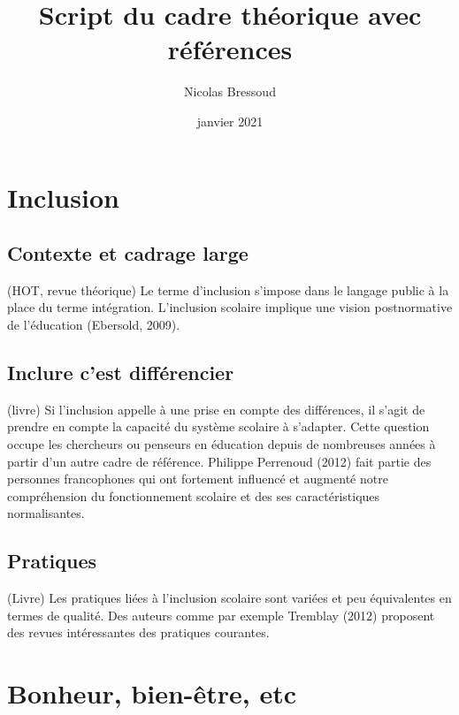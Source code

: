 \documentclass[
  french,
]{article}
\title{Script du cadre théorique avec références}
\author{Nicolas Bressoud}
\date{janvier 2021}
\begin{document}
\maketitle

\renewcommand*\contentsname{Table des matières}
{
\setcounter{tocdepth}{2}
\tableofcontents
}
\hypertarget{inclusion}{%
\section{Inclusion}\label{inclusion}}

\hypertarget{contexte-et-cadrage-large}{%
\subsection{Contexte et cadrage large}\label{contexte-et-cadrage-large}}

(HOT, revue théorique) Le terme d'inclusion s'impose dans le langage public à la place du terme intégration. L'inclusion scolaire implique une vision postnormative de l'éducation (Ebersold, 2009).

\hypertarget{inclure-cest-diffuxe9rencier}{%
\subsection{Inclure c'est différencier}\label{inclure-cest-diffuxe9rencier}}

(livre) Si l'inclusion appelle à une prise en compte des différences, il s'agit de prendre en compte la capacité du système scolaire à s'adapter. Cette question occupe les chercheurs ou penseurs en éducation depuis de nombreuses années à partir d'un autre cadre de référence. Philippe Perrenoud (2012) fait partie des personnes francophones qui ont fortement influencé et augmenté notre compréhension du fonctionnement scolaire et des ses caractéristiques normalisantes.

\hypertarget{pratiques}{%
\subsection{Pratiques}\label{pratiques}}

(Livre) Les pratiques liées à l'inclusion scolaire sont variées et peu équivalentes en termes de qualité. Des auteurs comme par exemple Tremblay (2012) proposent des revues intéressantes des pratiques courantes.

\hypertarget{bonheur-bien-uxeatre-etc}{%
\section{Bonheur, bien-être, etc}\label{bonheur-bien-uxeatre-etc}}
\end{document}

